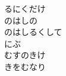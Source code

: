 \documentclass[10pt,b5j]{tarticle} %
\begin{document}
\begin{enumerate}
\begin{minipage}[c]{\blocksize}
        \vspace{\linespace}
        \item
        るにくだけ\\
        のはしの\\
        のはしるくして\\
        にぶ\\
        むすのきけ\\
        きをむなり
    
    \end{minipage}
\end{enumerate} %
\end{document}
